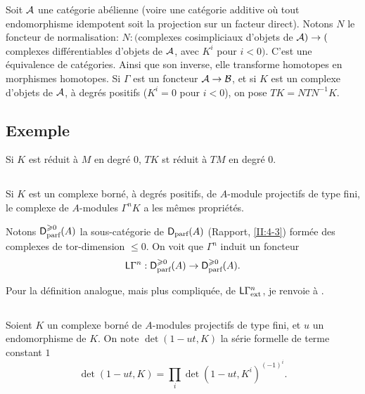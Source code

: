 \documentclass[oneside]{book}
\begin{document}
Soit $\mathcal{A}$ une cat\'egorie ab\'elienne (voire une cat\'egorie additive o\`u 
tout endomorphisme idempotent soit la projection sur un facteur direct). Notons 
$N$ le foncteur de normalisation: $N:($complexes cosimpliciaux d'objets de 
$\mathcal{A})\to($complexes différentiables d'objets de $\mathcal{A}$, avec $K^i$ pour 
$i<0)$. C'est une \'equivalence de cat\'egories. Ainsi que son inverse, elle 
transforme homotopes en morphismes homotopes. Si $\Gamma$ est un foncteur 
$\mathcal{A}\to\mathcal{B}$, et si $K$ est un complexe d'objets de $\mathcal{A}$, \`a degr\'es 
positifs ($K^i=0$ pour $i<0$), on pose $T K=N T N^{-1} K$. 





\subsection{Exemple}\label{III:1-5}

Si $K$ est r\'eduit \`a $M$ en degr\'e $0$, $T K$ st r\'eduit \`a $T M$ en 
degr\'e $0$. 





\subsection{}\label{III:1-6}

Si $K$ est un complexe born\'e, \`a degr\'es positifs, de $A$-module projectifs 
de type fini, le complexe de $A$-modules $\Gamma^n K$ a les m\^emes 
propri\'et\'es. 

Notons $\mathsf{D}_\text{parf}^{\geqslant 0}(A)$ la sous-cat\'egorie de 
$\mathsf{D}_\text{parf}(A)$ (Rapport, \ref{II:4-3}) form\'ee des complexes de 
tor-dimension $\leqslant 0$. On voit que $\Gamma^n$ induit un foncteur 
\[
  \mathsf{L}\Gamma^n : \mathsf{D}_\text{parf}^{\geqslant 0}(A) \to \mathsf{D}_\text{parf}^{\geqslant 0}(A) \text{.}
\]

Pour la d\'efinition analogue, mais plus compliqu\'ee, de 
$\mathsf{L}\Gamma_\text{ext}^n$, je renvoie \`a \cite[XVII 5.5.14]{sga4}. 





\subsection{}\label{III:1-7}

Soient $K$ un complexe born\'e de $A$-modules projectifs de type fini, et $u$ 
un endomorphisme de $K$. On note $\det(1-u t,K)$ la s\'erie formelle de terme 
constant $1$ 
\[
  \det(1-u t,K) = \prod_i \det(1-u t,K^i)^{(-1)^i} \text{.}
\]
\end{document}
